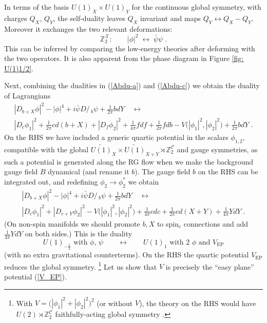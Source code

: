 \documentclass[a4paper, 12pt]{article}
\newcommand{\wt}{\widetilde}
\numberwithin{equation}{section}
\newcommand{\Dslash}{D\!\!\!\!\slash\,}
\newcommand{\be}{\begin{equation}} \newcommand{\ee}{\end{equation}}
\newcommand{\cC}{\mathcal{C}}
\newcommand{\cX}{\mathcal{X}}
\newcommand{\bZ}{\mathbb{Z}}
\begin{document}
In terms of the basis $U(1)_X \times U(1)_Y$ for the continuous global symmetry, with charges $Q_X$, $Q_Y$, the self-duality leaves $Q_X$ invariant and maps $Q_Y \leftrightarrow Q_X - Q_Y$. Moreover it exchanges the two relevant deformations:
\be
\bZ_2^\cX:\qquad |\phi|^2 \;\leftrightarrow\; \bar\psi\psi \;.
\ee
This can be inferred by comparing the low-energy theories after deforming with the two operators. It is also apparent from the phase diagram in Figure \ref{fig: U(1)1/2}.

Next, combining the dualities in (\ref{Abdu-a}) and (\ref{Abdu-c}) we obtain the duality of Lagrangians
\begin{multline}
|D_{b+X}\phi|^2 - |\phi|^4 + i \bar\psi \Dslash_b \psi + \frac1{2\pi} bdY \quad\longleftrightarrow \\
|D_c \phi_1|^2 + \frac1{2\pi} cd(b+X) + |D_f\phi_2|^2 + \frac1{4\pi} fdf + \frac1{2\pi}fdb - V\big( |\phi_1|^2, |\phi_2|^2 \big) + \frac1{2\pi}bdY \;.
\end{multline}
On the RHS we have included a generic quartic potential in the scalars $\phi_{1,2}$, compatible with the global $\wt{U(1)}_X \times \wt{U(1)}_{X+Y} \rtimes \bZ_2^\cC$ and gauge symmetries, as such a potential is generated along the RG flow when we make the background gauge field $B$ dynamical (and rename it $b$). The gauge field $b$ on the RHS can be integrated out, and redefining $\phi_2 \to \phi_2^*$ we obtain
\begin{multline}
\label{Abelian duality 3}
|D_{b+X}\phi|^2 - |\phi|^4 + i \bar\psi \Dslash_b \psi + \frac1{2\pi} bdY \quad\longleftrightarrow \\
|D_c\phi_1|^2 + |D_{c+Y}\phi_2|^2 - V\big( |\phi_1|^2, |\phi_2|^2 \big) + \frac1{4\pi} cdc + \frac1{2\pi}cd(X+Y) + \frac1{4\pi}YdY \;.
\end{multline}
(On non-spin manifolds we should promote $b,X$ to spin$_c$ connections and add $\frac1{4\pi} YdY$ on both sides.)
This is the duality
\be
U(1)_{-\frac12} \text{ with $\phi$, $\psi$} \qquad\longleftrightarrow\qquad U(1)_1 \text{ with 2 $\phi$ and $V_\text{EP}$}
\ee
(with no extra gravitational counterterms). On the RHS the quartic potential $V_\text{EP}$ reduces the global symmetry.%
\footnote{With $V = \big( |\phi_1|^2 + |\phi_2|^2 \big)^2$ (or without $V$), the theory on the RHS would have $U(2) \rtimes \bZ_2^\cC$ faithfully-acting global symmetry \cite{Benini:2017dus}.}
Let us show that $V$ is precisely the ``easy plane'' potential (\ref{V_EP}).
\end{document}
